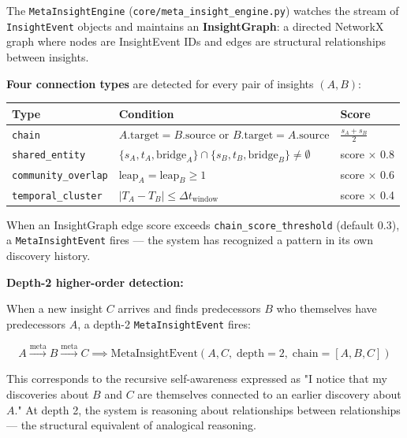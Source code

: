 \documentclass[10pt,journal,compsoc]{IEEEtran}
\begin{document}
The \texttt{MetaInsightEngine} (\texttt{core/meta\_insight\_engine.py}) watches the stream of \texttt{InsightEvent} objects and maintains an \textbf{InsightGraph}: a directed NetworkX graph where nodes are InsightEvent IDs and edges are structural relat\-ionships between insights.

\textbf{Four connection types} are detected for every pair of insights $(A, B)$:

\begin{center}
{\footnotesize
\begin{tabularx}{\columnwidth}{|>{\raggedright\arraybackslash}X|>{\raggedright\arraybackslash}X|>{\raggedright\arraybackslash}X|}
\hline
Type & Condition & Score \\ \hline
\texttt{chain} & $A.\text{target} = B.\text{source}$ or $B.\text{target} = A.\text{source}$ & $\frac{s_A + s_B}{2}$ \\ \hline
\texttt{shared\_entity} & $\{s_A, t_A, \text{bridge}_A\} \cap \{s_B, t_B, \text{bridge}_B\} \neq \emptyset$ & score $\times$ 0.8 \\ \hline
\texttt{community\_overlap} & $\text{leap}_A = \text{leap}_B \geq 1$ & score $\times$ 0.6 \\ \hline
\texttt{temporal\_cluster} & $|T_A - T_B| \leq \Delta t_{\text{window}}$ & score $\times$ 0.4 \\ \hline
\end{tabularx}
}
\end{center}

When an InsightGraph edge score exceeds \texttt{chain\_score\_threshold} (default 0.3), a \texttt{MetaInsightEvent} fires — the system has recognized a pattern in its own discovery history.

\textbf{Depth-2 higher-order detection:}

When a new insight $C$ arrives and finds prede\-cessors $B$ who themselves have prede\-cessors $A$, a depth-2 \texttt{MetaInsightEvent} fires:

\begin{equation}
A \xrightarrow{\text{meta}} B \xrightarrow{\text{meta}} C \implies \text{MetaInsightEvent}(A, C,\; \text{depth}=2,\; \text{chain}=[A, B, C])
\end{equation}

This corresponds to the recursive self-awareness expressed as "I notice that my discoveries about $B$ and $C$ are themselves connected to an earlier discovery about $A$." At depth 2, the system is reasoning about relat\-ionships between relat\-ionships — the structural equivalent of analogical reasoning.
\end{document}
